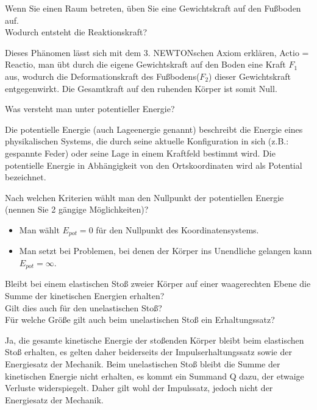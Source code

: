 \documentclass[12pt,a4paper,ngerman]{article}
\begin{document}
\begin{framed}
Wenn Sie einen Raum betreten, üben Sie eine Gewichtskraft
auf den Fußboden auf. \\ Wodurch entsteht die Reaktionskraft?
\end{framed}


Dieses Phänomen lässt sich mit dem 3. NEWTONschen Axiom erklären, Actio = Reactio, man übt durch die eigene Gewichtskraft auf den Boden eine Kraft $F_1$ aus, wodurch die Deformationskraft des Fußbodens($F_2$) dieser Gewichtskraft entgegenwirkt. Die Gesamtkraft auf den ruhenden Körper ist somit Null. 


\begin{framed}
Was versteht man unter potentieller Energie?
\end{framed}

Die potentielle Energie (auch Lageenergie genannt) beschreibt die Energie eines physikalischen Systems, die durch seine aktuelle Konfiguration in sich (z.B.: gespannte Feder) oder seine Lage in einem Kraftfeld bestimmt wird. Die potentielle Energie in Abhängigkeit von den Ortskoordinaten wird als Potential bezeichnet. 



\begin{framed}
Nach welchen Kriterien wählt man den Nullpunkt der potentiellen
Energie (nennen Sie 2 gängige Möglichkeiten)?
\end{framed}


\begin{itemize}
\item Man wählt $E_{pot}=0$ für den Nullpunkt des Koordinatensystems.
\item Man setzt bei Problemen, bei denen der Körper ins Unendliche
gelangen kann $E_{pot}=\infty$.
\end{itemize}


\begin{framed}
Bleibt bei einem elastischen Stoß zweier Körper auf einer
waagerechten Ebene die Summe der kinetischen Energien erhalten?\\ Gilt
dies auch für den unelastischen Stoß?\\ Für welche Größe gilt auch beim
unelastischen Stoß ein Erhaltungssatz?
\end{framed}


Ja, die gesamte kinetische Energie der stoßenden Körper bleibt beim elastischen Stoß erhalten, es gelten daher beiderseits der Impulserhaltungssatz sowie der Energiesatz der Mechanik. Beim unelastischen Stoß bleibt die Summe der kinetischen Energie nicht erhalten, es kommt ein Summand Q dazu, der etwaige Verluste widerspiegelt. Daher gilt wohl der Impulssatz, jedoch nicht der Energiesatz der Mechanik. 
\end{document}
